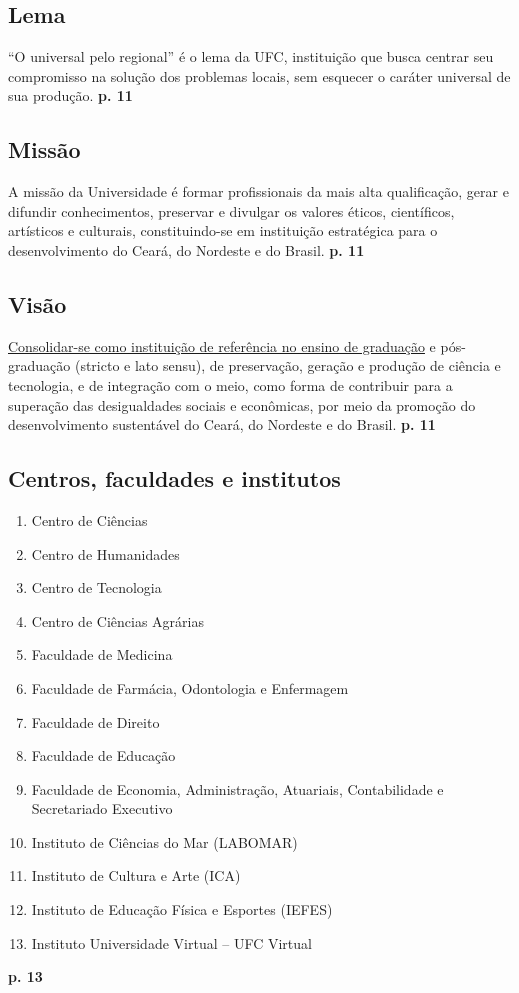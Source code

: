 \documentclass{report}
\begin{document}
\subsection{Lema}

“O universal pelo regional” é o lema da UFC, instituição que busca centrar seu compromisso na solução dos problemas locais, sem esquecer o caráter universal de sua produção.
\textbf{p. 11}

\subsection{Missão}

A missão da Universidade é formar profissionais da mais alta qualificação, gerar e difundir conhecimentos, preservar e divulgar os valores éticos, científicos, artísticos e culturais, constituindo-se em instituição estratégica para o desenvolvimento do Ceará, do Nordeste e do Brasil.
\textbf{p. 11}

\subsection{Visão}

\underline{Consolidar-se como instituição de referência no ensino de graduação} e pós-graduação (stricto e lato sensu), de preservação, geração e produção de ciência e tecnologia, e de integração com o meio, como forma de contribuir para a superação das desigualdades sociais e econômicas, por meio da promoção do desenvolvimento sustentável do Ceará, do Nordeste e do Brasil.
\textbf{p. 11}

\subsection{Centros, faculdades e institutos}

\begin{enumerate}
\item 
Centro de Ciências
\item 
Centro de Humanidades
\item 
Centro de Tecnologia
\item 
Centro de Ciências Agrárias
\item 
Faculdade de Medicina
\item 
Faculdade de Farmácia, Odontologia e Enfermagem
\item 
Faculdade de Direito
\item 
Faculdade de Educação
\item 
Faculdade de Economia, Administração, Atuariais, Contabilidade e Secretariado Executivo
\item 
Instituto de Ciências do Mar (LABOMAR)
\item 
Instituto de Cultura e Arte (ICA)
\item 
Instituto de Educação Física e Esportes (IEFES)
\item 
Instituto Universidade Virtual – UFC Virtual
\end{enumerate}
\textbf{p. 13}
\end{document}
